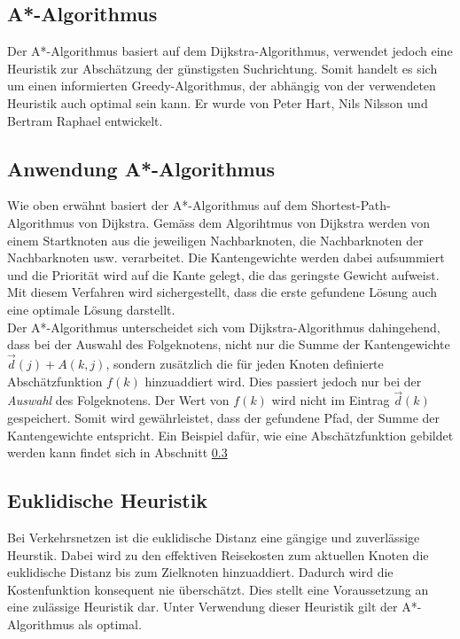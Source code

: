 \subsection{A*-Algorithmus}
Der A*-Algorithmus basiert auf dem Dijkstra-Algorithmus, verwendet jedoch eine Heuristik zur Abschätzung der günstigsten Suchrichtung. Somit handelt es sich um einen informierten Greedy-Algorithmus, der abhängig von der verwendeten Heuristik auch optimal sein kann. Er wurde von Peter Hart, Nils Nilsson und Bertram Raphael entwickelt.

\subsection{Anwendung A*-Algorithmus}
Wie oben erwähnt basiert der A*-Algorithmus auf dem Shortest-Path-Algorithmus von Dijkstra. Gemäss dem Algorihtmus von Dijkstra werden von einem Startknoten aus die jeweiligen Nachbarknoten, die Nachbarknoten der Nachbarknoten usw. verarbeitet. Die Kantengewichte werden dabei aufsummiert und die Priorität wird auf die Kante gelegt, die das geringste Gewicht aufweist. Mit diesem Verfahren wird sichergestellt, dass die erste gefundene Lösung auch eine optimale Lösung darstellt.\\

Der A*-Algorithmus unterscheidet sich vom Dijkstra-Algorithmus dahingehend, dass bei der Auswahl des Folgeknotens, nicht nur die Summe der Kantengewichte $\vec{d}(j)+A(k,j)$, sondern zusätzlich die für jeden Knoten definierte Abschätzfunktion $f(k)$ hinzuaddiert wird. Dies passiert jedoch nur bei der \emph{Auswahl} des Folgeknotens. Der Wert von $f(k)$ wird nicht im Eintrag $\vec{d}(k)$ gespeichert. Somit wird gewährleistet, dass der gefundene Pfad, der Summe der Kantengewichte entspricht. Ein Beispiel dafür, wie eine Abschätzfunktion gebildet werden kann findet sich in Abschnitt \ref{sec:verkehr/euklidische}

\subsection{Euklidische Heuristik}
\label{sec:verkehr/euklidische}
Bei Verkehrsnetzen ist die euklidische Distanz eine gängige und zuverlässige Heurstik. Dabei wird zu den effektiven Reisekosten zum aktuellen Knoten die euklidische Distanz bis zum Zielknoten hinzuaddiert. Dadurch wird die Kostenfunktion konsequent nie überschätzt. Dies stellt eine Voraussetzung an eine zulässige Heuristik dar. Unter Verwendung dieser Heuristik gilt der A*-Algorithmus als optimal.

